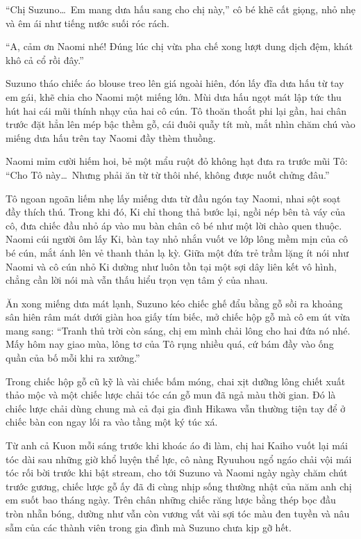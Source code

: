 \documentclass[../main.tex]{subfiles}
\begin{document}
``Chị Suzuno\dots\ Em mang dưa hấu sang cho chị này,'' cô bé khẽ cất giọng, nhỏ nhẹ và êm ái như tiếng nước suối róc rách.

``A, cảm ơn Naomi nhé! Đúng lúc chị vừa pha chế xong lượt dung dịch đệm, khát khô cả cổ rồi đây.''

Suzuno tháo chiếc áo blouse treo lên giá ngoài hiên, đón lấy đĩa dưa hấu từ tay em gái, khẽ chia cho Naomi một miếng lớn. Mùi dưa hấu ngọt mát lập tức thu hút hai cái mũi thính nhạy của hai cô cún. Tô thoăn thoắt phi lại gần, hai chân trước đặt hẳn lên mép bậc thềm gỗ, cái đuôi quẫy tít mù, mắt nhìn chăm chú vào miếng dưa hấu trên tay Naomi đầy thèm thuồng.

Naomi mỉm cười hiếm hoi, bẻ một mẩu ruột đỏ không hạt đưa ra trước mũi Tô: ``Cho Tô này\dots\ Nhưng phải ăn từ từ thôi nhé, không được nuốt chửng đâu.''

Tô ngoan ngoãn liếm nhẹ lấy miếng dưa từ đầu ngón tay Naomi, nhai sột soạt đầy thích thú. Trong khi đó, Ki chỉ thong thả bước lại, ngồi nép bên tà váy của cô, đưa chiếc đầu nhỏ áp vào mu bàn chân cô bé như một lời chào quen thuộc. Naomi cúi người ôm lấy Ki, bàn tay nhỏ nhắn vuốt ve lớp lông mềm mịn của cô bé cún, mắt ánh lên vẻ thanh thản lạ kỳ. Giữa một đứa trẻ trầm lặng ít nói như Naomi và cô cún nhỏ Ki dường như luôn tồn tại một sợi dây liên kết vô hình, chẳng cần lời nói mà vẫn thấu hiểu trọn vẹn tâm ý của nhau.

Ăn xong miếng dưa mát lạnh, Suzuno kéo chiếc ghế đẩu bằng gỗ sồi ra khoảng sân hiên râm mát dưới giàn hoa giấy tím biếc, mở chiếc hộp gỗ mà cô em út vừa mang sang: ``Tranh thủ trời còn sáng, chị em mình chải lông cho hai đứa nó nhé. Mấy hôm nay giao mùa, lông tơ của Tô rụng nhiều quá, cứ bám đầy vào ống quần của bố mỗi khi ra xưởng.''

Trong chiếc hộp gỗ cũ kỹ là vài chiếc bấm móng, chai xịt dưỡng lông chiết xuất thảo mộc và một chiếc lược chải tóc cán gỗ mun đã ngả màu thời gian. Đó là chiếc lược chải dùng chung mà cả đại gia đình Hikawa vẫn thường tiện tay để ở chiếc bàn con ngay lối ra vào tầng một ký túc xá.

Từ anh cả Kuon mỗi sáng trước khi khoác áo đi làm, chị hai Kaiho vuốt lại mái tóc dài sau những giờ khổ luyện thể lực, cô nàng Ryuuhou ngổ ngáo chải vội mái tóc rối bời trước khi bật stream, cho tới Suzuno và Naomi ngày ngày chăm chút trước gương, chiếc lược gỗ ấy đã đi cùng nhịp sống thường nhật của năm anh chị em suốt bao tháng ngày. Trên chân những chiếc răng lược bằng thép bọc đầu tròn nhẵn bóng, dường như vẫn còn vương vất vài sợi tóc màu đen tuyền và nâu sẫm của các thành viên trong gia đình mà Suzuno chưa kịp gỡ hết.
\end{document}
